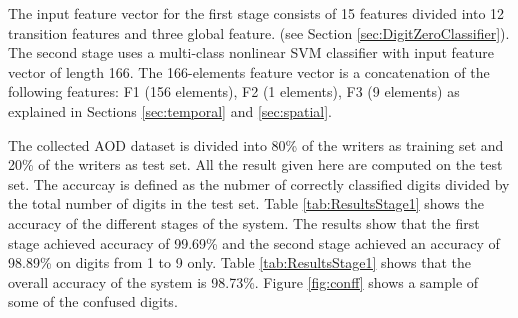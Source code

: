 \documentclass[times, 10pt,twocolumn]{article}
\begin{document}
The input feature vector for the first stage consists of 15 features divided into 12 transition features and three global feature. (see Section \ref{sec:DigitZeroClassifier}). The second stage uses a multi-class nonlinear SVM classifier with input feature vector of length 166. The 166-elements feature vector is a concatenation of the following features: F1 (156 elements), F2 (1 elements), F3 (9 elements) as explained in Sections   \ref{sec:temporal} and  \ref{sec:spatial}.

The collected AOD dataset is divided into 80\% of the writers as training set and 20\% of the writers as test set. All the result given here are computed on the test set. The accurcay is defined as the nubmer of correctly classified digits divided by the total number of digits in the test set. Table \ref{tab:ResultsStage1} shows the accuracy of the different stages of the system. The results show that the first stage achieved accuracy of 99.69\% and the second stage achieved an accuracy of 98.89\% on digits from 1 to 9 only. Table \ref{tab:ResultsStage1} shows that the overall accuracy of the system is 98.73\%. Figure \ref{fig:conff} shows a sample of some of the confused digits.





\end{document}
